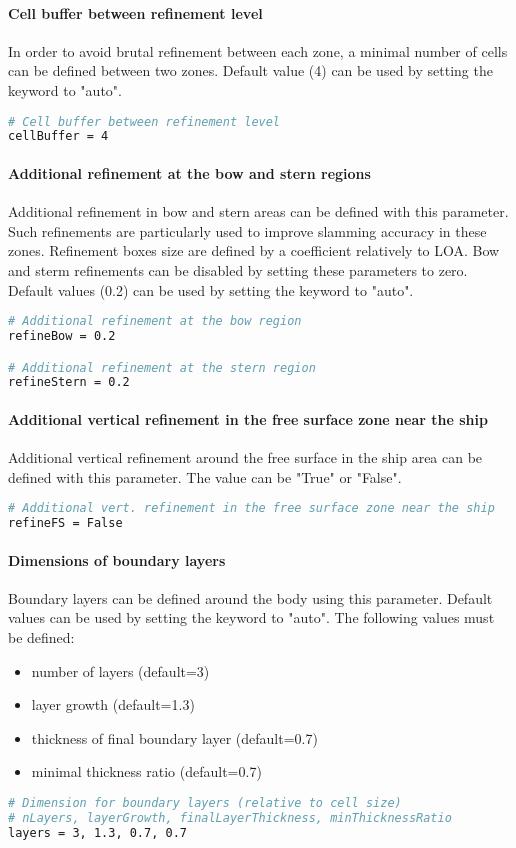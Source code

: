 \paragraph{Cell buffer between refinement level}
In order to avoid brutal refinement between each zone, a minimal number of cells can be defined between two zones. Default value (4) can be used by setting the keyword to "auto".
\begin{lstlisting}[language=bash]
# Cell buffer between refinement level
cellBuffer = 4
\end{lstlisting}

\paragraph{Additional refinement at the bow and stern regions}
Additional refinement in bow and stern areas can be defined with this parameter. Such refinements are particularly used to improve slamming accuracy in these zones. Refinement boxes size are defined by a coefficient relatively to LOA. Bow and sterm refinements can be disabled by setting these parameters to zero. Default values (0.2) can be used by setting the keyword to "auto".
\begin{lstlisting}[language=bash]
# Additional refinement at the bow region
refineBow = 0.2

# Additional refinement at the stern region
refineStern = 0.2
\end{lstlisting}

\paragraph{Additional vertical refinement in the free surface zone near the ship}
Additional vertical refinement around the free surface in the ship area can be defined with this parameter. The value can be "True" or "False".
\begin{lstlisting}[language=bash]
# Additional vert. refinement in the free surface zone near the ship
refineFS = False
\end{lstlisting}

\paragraph{Dimensions of boundary layers}
Boundary layers can be defined around the body using this parameter. Default values can be used by setting the keyword to "auto". The following values must be defined:
\begin{itemize}
\item number of layers (default=3)
\item layer growth (default=1.3)
\item thickness of final boundary layer (default=0.7)
\item minimal thickness ratio (default=0.7)
\end{itemize}
\begin{lstlisting}[language=bash]
# Dimension for boundary layers (relative to cell size)
# nLayers, layerGrowth, finalLayerThickness, minThicknessRatio
layers = 3, 1.3, 0.7, 0.7
\end{lstlisting}

